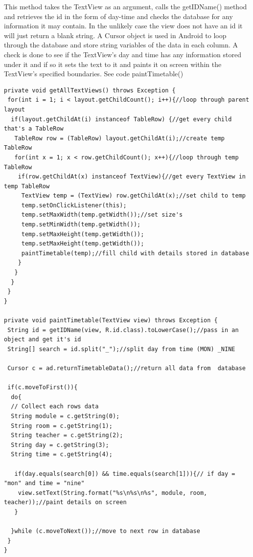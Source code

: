 This method takes the TextView as an argument, calls the getIDName() method and retrieves the id in the form of day-time and checks the database for any information it may contain. In the unlikely case the view does not have an id it will just return a blank string. A Cursor object is used in Android to loop through the database and store string variables of the data in each column. A check is done to see if the TextView's day and time has any information stored under it and if so it sets the text to it and paints it on screen within the TextView's specified boundaries. See code paintTimetable()
\pagebreak

\begin{verbatim}
private void getAllTextViews() throws Exception {
 for(int i = 1; i < layout.getChildCount(); i++){//loop through parent layout
  if(layout.getChildAt(i) instanceof TableRow) {//get every child that's a TableRow
   TableRow row = (TableRow) layout.getChildAt(i);//create temp TableRow
   for(int x = 1; x < row.getChildCount(); x++){//loop through temp TableRow
    if(row.getChildAt(x) instanceof TextView){//get every TextView in temp TableRow
     TextView temp = (TextView) row.getChildAt(x);//set child to temp
 	 temp.setOnClickListener(this);
	 temp.setMaxWidth(temp.getWidth());//set size's
	 temp.setMinWidth(temp.getWidth());		
	 temp.setMaxHeight(temp.getWidth());
	 temp.setMaxHeight(temp.getWidth());		
	 paintTimetable(temp);//fill child with details stored in database
    }
   }
  }
 }
}

private void paintTimetable(TextView view) throws Exception {
 String id = getIDName(view, R.id.class).toLowerCase();//pass in an object and get it's id
 String[] search = id.split("_");//split day from time (MON) _NINE
 
 Cursor c = ad.returnTimetableData();//return all data from  database
 
 if(c.moveToFirst()){
  do{
  // Collect each rows data
  String module = c.getString(0);
  String room = c.getString(1);
  String teacher = c.getString(2);
  String day = c.getString(3);
  String time = c.getString(4);
 
   if(day.equals(search[0]) && time.equals(search[1])){// if day = "mon" and time = "nine"
    view.setText(String.format("%s\n%s\n%s", module, room, teacher));//paint details on screen
   }
 
  }while (c.moveToNext());//move to next row in database
 }
}
\end{verbatim}

